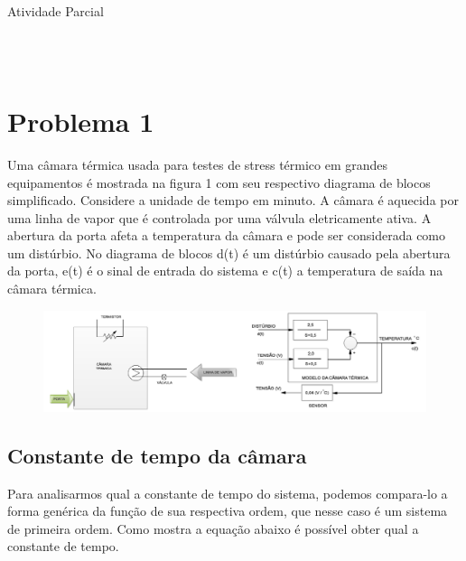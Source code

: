 \documentclass[a4paper,12pt]{article}
\begin{document}
	\begin{center}
		\begin{Huge}
			Atividade Parcial
		\end{Huge}
	\end{center}

	\begin{center}
		\\
		\\
		
		
		
	\end{center}
	
	\paragraph{}
	
	\section{Problema 1}
	Uma câmara térmica usada para testes de stress térmico em grandes equipamentos é mostrada na figura 1 com seu respectivo diagrama de blocos simplificado. Considere a unidade de tempo em minuto. A câmara é aquecida por uma linha de vapor que é controlada por uma válvula eletricamente ativa. A abertura da porta afeta a temperatura da câmara e pode ser considerada como um distúrbio. No diagrama de blocos d(t) é um distúrbio causado pela abertura da porta, e(t) é o sinal de entrada do sistema e c(t) a temperatura de saída na câmara térmica.
	

	\begin{figure}[H]
		\centering
		\includegraphics[width=0.9\linewidth]{images/planta_problema1}
		\label{fig:plantaproblema1}
	\end{figure}

	\subsection{Constante de tempo da câmara}
		Para analisarmos qual a constante de tempo do sistema, podemos compara-lo a forma genérica da função de sua respectiva ordem, que nesse caso é um sistema de primeira ordem. Como mostra a equação abaixo é possível obter qual a constante de tempo.
	
\end{document}
